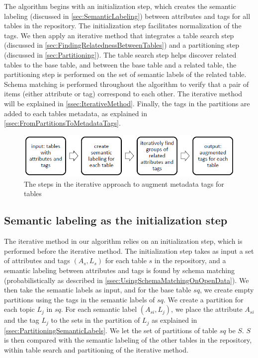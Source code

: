 The algorithm begins with an initialization step, which creates the semantic labeling (discussed in \autoref{sec:SemanticLabeling}) between attributes and tags for all tables in the repository. The initialization step facilitates normalization of the tags. We then apply an iterative method that integrates a table search step (discussed in \autoref{sec:FindingRelatednessBetweenTables}) and a partitioning step (discussed in \autoref{sec:Partitioning}). The table search step helps discover related tables to the base table, and between the base table and a related table, the partitioning step is performed on the set of semantic labels of the related table. Schema matching is performed throughout the algorithm to verify that a pair of items (either attribute or tag) correspond to each other. The iterative method will be explained in \autoref{ssec:IterativeMethod}. Finally, the tags in the partitions are added to each tables metadata, as explained in \autoref{ssec:FromPartitionsToMetadataTags}.

\begin{figure}
    \centering
    \includegraphics[width=5in]{figures/the-steps-iterative-approach.png}
    \caption{The steps in the iterative approach to augment metadata tags for tables}
    \label{fig:the-steps-iterative-approach}
\end{figure}

\subsection{Semantic labeling as the initialization step}
\label{ssec:SemanticLabelingAsTheInitializationStep}

The iterative method in our algorithm relies on an initialization step, which is performed before the iterative method. The initialization step takes as input a set of attributes and tags $(A_{s},L_{s})$ for each table $s$ in the repository, and a semantic labeling between attributes and tags is found by schema matching (probabilistically as described in \autoref{ssec:UsingSchemaMatchingOnOpenData}). We then take the semantic labels as input, and for the base table $sq$, we create empty partitions using the tags in the semantic labels of $sq$. We create a partition for each topic $L_{j}$ in $sq$. For each semantic label $(A_{si},L_{j})$, we place the attribute $A_{si}$ and the tag $L_{j}$ to the sets in the partition of $L_{j}$ as explained in \autoref{ssec:PartitioningSemanticLabels}. We let the set of partitions of table $sq$ be $S$. $S$ is then compared with the semantic labeling of the other tables in the repository, within table search and partitioning of the iterative method.

